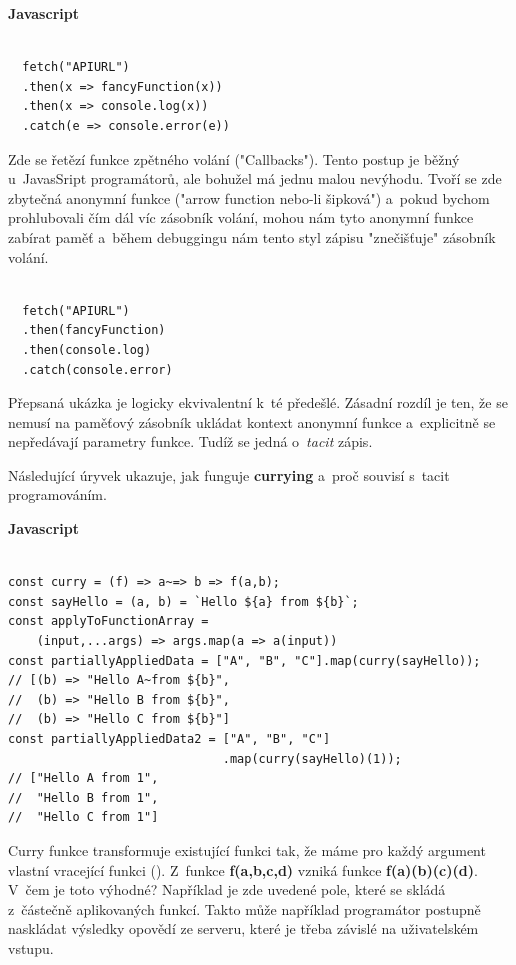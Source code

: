 \documentclass[male, czech]{kithesis}
\begin{document}
\textbf{Javascript}
\begin{verbatim}

  fetch("APIURL")
  .then(x => fancyFunction(x))
  .then(x => console.log(x))
  .catch(e => console.error(e))

\end{verbatim}

Zde se řetězí funkce zpětného volání ("Callbacks"). 
Tento postup je běžný u~JavasSript programátorů,
ale bohužel má jednu malou nevýhodu.
Tvoří se zde zbytečná anonymní funkce ("arrow function nebo-li šipková") 
a~pokud bychom prohlubovali čím dál víc zásobník volání,
mohou nám tyto anonymní funkce zabírat paměť
a~během debuggingu nám tento styl zápisu "znečišťuje" 
zásobník volání. 

\begin{verbatim}

  fetch("APIURL")
  .then(fancyFunction)
  .then(console.log)
  .catch(console.error)

\end{verbatim}

Přepsaná ukázka je logicky ekvivalentní k~té předešlé. 
Zásadní rozdíl je ten, 
že se nemusí na paměťový zásobník ukládat kontext anonymní funkce 
a~explicitně se nepředávají parametry funkce. 
Tudíž se jedná o~\textit{tacit} zápis.

Následující úryvek ukazuje, 
jak funguje \textbf{currying} a~proč souvisí s~tacit programováním.

\textbf{Javascript}
\begin{verbatim}

const curry = (f) => a~=> b => f(a,b);
const sayHello = (a, b) = `Hello ${a} from ${b}`;
const applyToFunctionArray = 
    (input,...args) => args.map(a => a(input))
const partiallyAppliedData = ["A", "B", "C"].map(curry(sayHello)); 
// [(b) => "Hello A~from ${b}", 
//  (b) => "Hello B from ${b}", 
//  (b) => "Hello C from ${b}"]
const partiallyAppliedData2 = ["A", "B", "C"]
                              .map(curry(sayHello)(1)); 
// ["Hello A from 1", 
//  "Hello B from 1", 
//  "Hello C from 1"]

\end{verbatim}
Curry funkce transformuje existující funkci tak, 
že máme pro každý argument vlastní vracející funkci  (\cite{Currying}). 
Z~funkce \textbf{f(a,b,c,d)} vzniká funkce \textbf{f(a)(b)(c)(d)}.
V~čem je toto výhodné?
Například je zde uvedené pole, 
které se skládá z~částečně aplikovaných funkcí. 
Takto může například programátor postupně naskládat výsledky opovědí ze serveru,
které je třeba závislé na uživatelském vstupu. 
\end{document}
